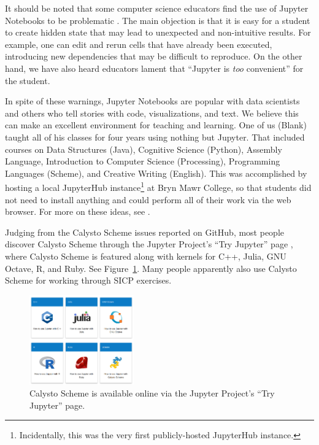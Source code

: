 \documentclass[acmsmall,screen,nonacm]{acmart}
\begin{document}

It should be noted that some computer science educators find the use of Jupyter
Notebooks to be problematic \cite{Johnson2020}. The main objection is that it
is easy for a student to create hidden state that may lead to unexpected and
non-intuitive results. For example, one can edit and rerun cells that have
already been executed, introducing new dependencies that may be difficult to
reproduce. On the other hand, we have also heard educators lament that
``Jupyter is \emph{too} convenient'' for the student.

In spite of these warnings, Jupyter Notebooks are popular with data scientists
and others who tell stories with code, visualizations, and text. We believe
this can make an excellent environment for teaching and learning. One of us
(Blank) taught all of his classes for four years using nothing but
Jupyter. That included courses on Data Structures (Java), Cognitive Science
(Python), Assembly Language, Introduction to Computer Science (Processing),
Programming Languages (Scheme), and Creative Writing (English). This was
accomplished by hosting a local JupyterHub instance\footnote[3]{Incidentally,
  this was the very first publicly-hosted JupyterHub instance.} at Bryn Mawr
College, so that students did not need to install anything and could perform
all of their work via the web browser. For more on these ideas, see
\cite{Calico2}.

Judging from the Calysto Scheme issues reported on GitHub, most people discover
Calysto Scheme through the Jupyter Project's ``Try Jupyter'' page
\cite{TryJupyter}, where Calysto Scheme is featured along with kernels for C++,
Julia, GNU Octave, R, and Ruby. See Figure~\ref{fig:try-jupyter}. Many people
apparently also use Calysto Scheme for working through SICP exercises.


\begin{figure}[h]
  \centering
  \includegraphics[width=0.4\textwidth]{try-jupyter.png}
  \caption{Calysto Scheme is available online via the Jupyter Project's ``Try Jupyter'' page.}
  \label{fig:try-jupyter}
\end{figure}
\end{document}
